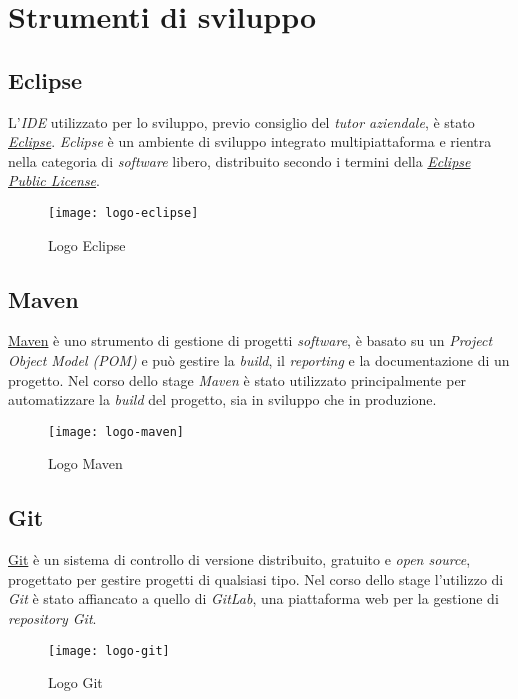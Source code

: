 \newpage
\section{Strumenti di sviluppo}
\label{strum}

\subsection{Eclipse}
\label{eclipse}
L'\textit{IDE} utilizzato per lo sviluppo, previo consiglio del \textit{tutor aziendale}, è stato \textit{\href{https://www.eclipse.org/}{Eclipse}}.
\textit{Eclipse} è un ambiente di sviluppo integrato multipiattaforma e rientra nella categoria di \textit{software} libero, distribuito secondo i termini della \textit{\href{https://www.eclipse.org/legal/epl-2.0/}{Eclipse Public License}}.
\begin{figure}[h]
    \begin{center}
    \texttt{[image: logo-eclipse]}
    \caption{Logo Eclipse}
    \label{fig:figure10}
    \end{center}
\end{figure}

\subsection{Maven}
\label{maven}
\href{https://maven.apache.org/}{Maven} è uno strumento di gestione di progetti \textit{software}, è basato su un \textit{Project Object Model (POM)} e può gestire la \textit{build}, il \textit{reporting} e la documentazione di un progetto. Nel corso dello stage \textit{Maven} è stato utilizzato principalmente per automatizzare la \textit{build} del progetto, sia in sviluppo che in produzione.
\begin{figure}[h]
    \begin{center}
    \texttt{[image: logo-maven]}
    \caption{Logo Maven}
    \label{fig:figure11}
    \end{center}
\end{figure}

\subsection{Git}
\label{git}
\href{https://git-scm.com/}{Git} è un sistema di controllo di versione distribuito, gratuito e \textit{open source}, progettato per gestire progetti di qualsiasi tipo. Nel corso dello stage l'utilizzo di \textit{Git} è stato affiancato a quello di \textit{GitLab}, una piattaforma web per la gestione di \textit{repository Git}.
\begin{figure}[h]
    \begin{center}
    \texttt{[image: logo-git]}
    \caption{Logo Git}
    \label{fig:figure12}
    \end{center}
\end{figure}
